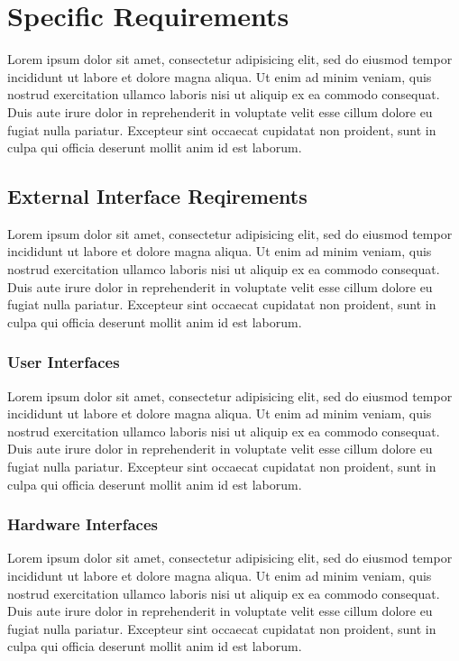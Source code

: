 \documentclass[10pt,a4paper]{report}
\begin{document}
	\chapter{Specific Requirements}
	Lorem ipsum dolor sit amet, consectetur adipisicing elit, sed do eiusmod
	tempor incididunt ut labore et dolore magna aliqua. Ut enim ad minim veniam,
	quis nostrud exercitation ullamco laboris nisi ut aliquip ex ea commodo
	consequat. Duis aute irure dolor in reprehenderit in voluptate velit esse
	cillum dolore eu fugiat nulla pariatur. Excepteur sint occaecat cupidatat non
	proident, sunt in culpa qui officia deserunt mollit anim id est laborum.
	
	\section{External Interface Reqirements}
	Lorem ipsum dolor sit amet, consectetur adipisicing elit, sed do eiusmod
	tempor incididunt ut labore et dolore magna aliqua. Ut enim ad minim veniam,
	quis nostrud exercitation ullamco laboris nisi ut aliquip ex ea commodo
	consequat. Duis aute irure dolor in reprehenderit in voluptate velit esse
	cillum dolore eu fugiat nulla pariatur. Excepteur sint occaecat cupidatat non
	proident, sunt in culpa qui officia deserunt mollit anim id est laborum.
	
	\subsection{User Interfaces}
	Lorem ipsum dolor sit amet, consectetur adipisicing elit, sed do eiusmod
	tempor incididunt ut labore et dolore magna aliqua. Ut enim ad minim veniam,
	quis nostrud exercitation ullamco laboris nisi ut aliquip ex ea commodo
	consequat. Duis aute irure dolor in reprehenderit in voluptate velit esse
	cillum dolore eu fugiat nulla pariatur. Excepteur sint occaecat cupidatat non
	proident, sunt in culpa qui officia deserunt mollit anim id est laborum.
	
	\subsection{Hardware Interfaces}
	Lorem ipsum dolor sit amet, consectetur adipisicing elit, sed do eiusmod
	tempor incididunt ut labore et dolore magna aliqua. Ut enim ad minim veniam,
	quis nostrud exercitation ullamco laboris nisi ut aliquip ex ea commodo
	consequat. Duis aute irure dolor in reprehenderit in voluptate velit esse
	cillum dolore eu fugiat nulla pariatur. Excepteur sint occaecat cupidatat non
	proident, sunt in culpa qui officia deserunt mollit anim id est laborum.
	
\end{document}
